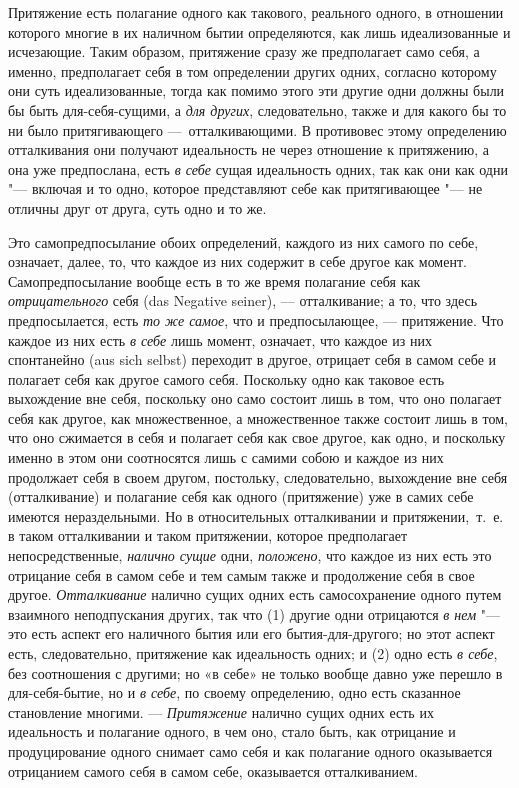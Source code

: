 Притяжение есть полагание одного как такового, реального одного, в отношении
которого многие в их наличном бытии определяются, как лишь идеализованные и
исчезающие. Таким образом, притяжение сразу же предполагает само себя, а
именно, предполагает себя в том определении других одних, согласно которому
они суть идеализованные, тогда как помимо этого эти другие одни должны были
бы быть для-себя-сущими, а {\em для других},
следовательно, также и для какого бы то ни было притягивающего
—~отталкивающими. В противовес этому определению отталкивания они получают
идеальность не через отношение к притяжению, а она уже предпослана, есть
{\em в себе} сущая идеальность одних, так как они как
одни "--- включая и то одно, которое представляют себе как притягивающее "--- не
отличны друг от друга, суть одно и то же.

Это самопредпосылание обоих определений, каждого из них самого по себе,
означает, далее, то, что каждое из них содержит в себе другое как момент.
Самопредпосылание вообще есть в то же время полагание себя как
{\em отрицательного} себя (das Negative seiner), —
отталкивание; а то, что здесь предпосылается, есть
{\em то же самое}, что и предпосылающее, — притяжение.
Что каждое из них есть {\em в себе} лишь момент,
означает, что каждое из них спонтанейно (aus sich selbst) переходит в
другое, отрицает себя в самом себе и полагает себя как другое самого себя.
Поскольку одно как таковое есть выхождение вне себя, поскольку оно само
состоит лишь в том, что оно полагает себя как другое, как множественное, а
множественное также состоит лишь в том, что оно сжимается в себя и полагает
себя как свое другое, как одно, и поскольку именно в этом они соотносятся
лишь с самими собою и каждое из них продолжает себя в своем другом,
постольку, следовательно, выхождение вне себя (отталкивание) и полагание
себя как одного (притяжение) уже в самих себе имеются нераздельными. Но в
относительных отталкивании и притяжении,~т.~е. в таком отталкивании и таком
притяжении, которое предполагает непосредственные,
{\em налично сущие} одни,
{\em положено}, что каждое из них есть это отрицание
себя в самом себе и тем самым также и продолжение себя в свое другое.
{\em Отталкивание} налично сущих одних есть
самосохранение одного путем взаимного неподпускания других, так что (1)
другие одни отрицаются {\em в нем} "--- это есть аспект
его наличного бытия или его бытия-для-другого; но этот аспект есть,
следовательно, притяжение как идеальность одних; и (2) одно есть
{\em в себе}, без соотношения с другими; но «в себе» не
только вообще давно уже перешло в для-себя-бытие, но и
{\em в себе}, по своему определению, одно есть
сказанное становление многими. — {\em Притяжение}
налично сущих одних есть их идеальность и полагание одного, в чем оно,
стало быть, как отрицание и продуцирование одного снимает само себя и как
полагание одного оказывается отрицанием самого себя в самом себе,
оказывается отталкиванием.

